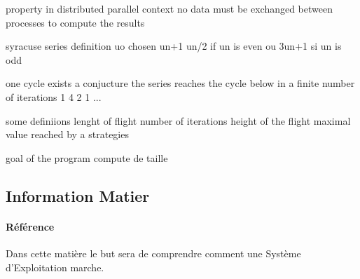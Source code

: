 \documentclass{article}
\begin{document}
property
in distributed parallel context no data must be exchanged between processes to compute the results


syracuse series
definition
uo chosen
un+1 un/2 if un is even ou 3un+1 si un is odd

one cycle exists a conjucture the series reaches the cycle below in a finite number of iterations
1 4 2 1 ...

some definiions
lenght of flight number of iterations
height of the flight maximal value reached by a strategies

goal of the program compute de taille




\subsection{Information Matier}
\paragraph{Référence}Dans cette matière le but sera de comprendre comment une Système d'Exploitation marche.
\end{document}
